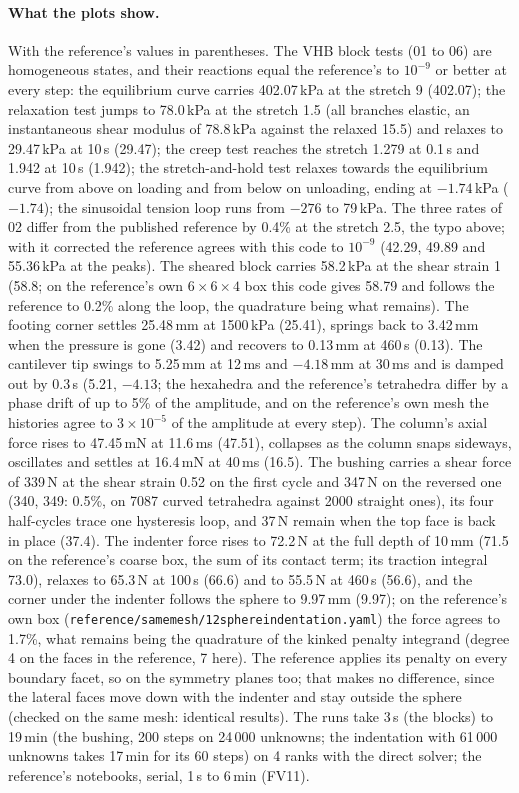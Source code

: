 \documentclass[11pt]{article}
\DeclareRobustCommand{\file}[1]{{\def\_{\textunderscore\allowbreak}\texttt{#1}}}
\begin{document}
\paragraph{What the plots show.}
With the reference's values in parentheses.  The VHB block tests (01 to
06) are homogeneous states, and their reactions equal the reference's to
$10^{-9}$ or better at every step: the equilibrium curve carries
402.07\,kPa at the stretch 9 (402.07); the relaxation test jumps to
78.0\,kPa at the stretch 1.5 (all branches elastic, an instantaneous shear
modulus of 78.8\,kPa against the relaxed 15.5) and relaxes to 29.47\,kPa at
10\,s (29.47); the creep test reaches the stretch 1.279 at 0.1\,s and 1.942
at 10\,s (1.942); the stretch-and-hold test relaxes towards the equilibrium
curve from above on loading and from below on unloading, ending at
$-1.74$\,kPa ($-1.74$); the sinusoidal tension loop runs from $-276$ to
79\,kPa.  The three rates of 02 differ from the published reference by 0.4\%
at the stretch 2.5, the typo above; with it corrected the reference agrees
with this code to $10^{-9}$ (42.29, 49.89 and 55.36\,kPa at the peaks).
The sheared block carries 58.2\,kPa at the shear strain 1 (58.8; on the
reference's own $6\times6\times4$ box this code gives 58.79 and follows the
reference to 0.2\% along the loop, the quadrature being what remains).  The
footing corner settles 25.48\,mm at 1500\,kPa (25.41), springs back to
3.42\,mm when the pressure is gone (3.42) and recovers to 0.13\,mm at
460\,s (0.13).  The cantilever tip swings to 5.25\,mm at 12\,ms and
$-4.18$\,mm at 30\,ms and is damped out by 0.3\,s (5.21, $-4.13$; the
hexahedra and the reference's tetrahedra differ by a phase drift of up to
5\% of the amplitude, and on the reference's own mesh the histories agree to
$3\times10^{-5}$ of the amplitude at every step).  The column's axial force
rises to 47.45\,mN at 11.6\,ms (47.51), collapses as the column snaps
sideways, oscillates and settles at 16.4\,mN at 40\,ms (16.5).  The bushing carries
a shear force of 339\,N at the shear strain 0.52 on the first cycle and
347\,N on the reversed one (340, 349: 0.5\%, on 7087 curved tetrahedra
against 2000 straight ones), its four half-cycles trace one hysteresis
loop, and 37\,N remain when the top face is back in place (37.4).  The indenter force rises to 72.2\,N at the full depth of 10\,mm (71.5 on
the reference's coarse box, the sum of its contact term; its traction
integral 73.0), relaxes to 65.3\,N at 100\,s (66.6) and to 55.5\,N at
460\,s (56.6), and the corner under the indenter follows the sphere to
9.97\,mm (9.97); on the reference's own box
(\file{reference/same\_mesh/12\_sphere\_indentation.yaml}) the force agrees
to 1.7\%, what remains being the quadrature of the kinked penalty integrand
(degree 4 on the faces in the reference, 7 here).  The reference applies
its penalty on every boundary facet, so on the symmetry planes too; that
makes no difference, since the lateral faces move down with the indenter
and stay outside the sphere (checked on the same mesh: identical results).  The runs take 3\,s (the blocks) to 19\,min (the bushing, 200 steps on
24\,000 unknowns; the indentation with 61\,000 unknowns takes 17\,min for its
60 steps) on
4 ranks with the direct solver; the reference's notebooks, serial, 1\,s to
6\,min (FV11).
\end{document}
